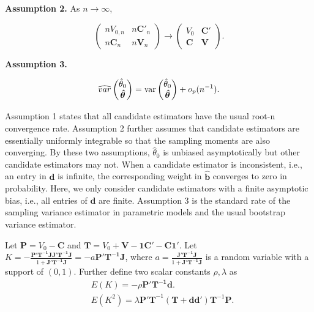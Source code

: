 \documentclass{article}
\begin{document}
\begin{flushleft}
\textbf{Assumption 2.} As $n \to \infty$,
\end{flushleft}
\begin{displaymath}   
\begin{pmatrix}    n V_{0,n} & n\mathbf C'_n\\
                             n\mathbf C_n     & n\mathbf V_n \end{pmatrix}
\rightarrow 
\begin{pmatrix}     V_0 & \mathbf C'\\
                             \mathbf C     & \mathbf V \end{pmatrix}.
\end{displaymath}

\begin{flushleft}
\textbf{Assumption 3.}
\end{flushleft}
\begin{displaymath}
\widehat{var} \begin{pmatrix} \hat\theta_0 \\ \boldsymbol{\hat \theta}  \end{pmatrix}
= \mbox{var} \begin{pmatrix} \hat\theta_0 \\ \boldsymbol{\hat \theta}  \end{pmatrix} + o_p(n^{-1}).
\end{displaymath}

Assumption 1 states that all candidate estimators have the usual root-n convergence rate. Assumption 2 further assumes that candidate estimators are essentially uniformly integrable so that the sampling moments are also converging.  By these two assumptions, $\hat \theta_0$ is unbiased asymptotically but  other candidate estimators may not.  When a candidate estimator is inconsistent, i.e., an entry in $\mathbf d$ is infinite, the corresponding weight in $\hat{\mathbf b}$ converges to zero in probability.  Here, we only consider candidate estimators with a finite asymptotic bias, i.e., all entries of  $\mathbf d$ are finite.  Assumption 3 is the standard rate of the sampling variance estimator in parametric models and the usual bootstrap variance estimator. 


Let $\mathbf P = V_0-\mathbf C$ and $\mathbf T = V_0 + \mathbf V - \mathbf 1 \mathbf C' - \mathbf C \mathbf 1'$. Let  $K =  -\frac{\mathbf {P' T^{-1}JJ'T^{-1}J}}{1+\mathbf{J'T^{-1}J}}
 = -a \mathbf {P'T^{-1}J}$, where $a = \frac{\mathbf{J'T^{-1}J}}{1+\mathbf{J'T^{-1}J}}$ is a random variable with a support of $(0, 1)$. Further define two scalar constants $\rho, \lambda$ as
\begin{equation}\begin{split}\label{eqn:consts}
	&E(K) = -\rho \mathbf {P'T^{-1}d}. \\
	&E(K^2) = \lambda  \mathbf{P'T}^{-1} (\mathbf T + \mathbf{dd'}) \mathbf{T}^{-1}\mathbf{P}.
\end{split}\end{equation}
\end{document}
